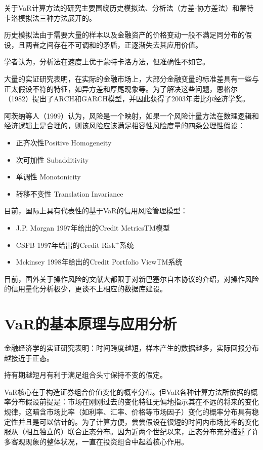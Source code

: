 \documentclass[UTF8]{ctexart}
\begin{document}
关于VaR计算方法的研究主要围绕历史模拟法、分析法（方差-协方差法）和蒙特卡洛模拟法三种方法展开的。

历史模拟法由于需要大量的样本以及金融资产的价格变动一般不满足同分布的假设，且两者之间存在不可调和的矛盾，正逐渐失去其应用价值。

学者认为，分析法在速度上优于蒙特卡洛方法，但准确性不如它。

大量的实证研究表明，在实际的金融市场上，大部分金融变量的标准差具有一些与正太假设不符的特征，如异方差和厚尾现象等。为了解决这些问题，恩格尔（1982）提出了ARCH和GARCH模型，并因此获得了2003年诺比尔经济学奖。

阿茨纳等人（1999）认为，风险是一个映射，如果一个风险计量方法在数理逻辑和经济逻辑上是合理的，则该风险应该满足相容性风险度量的四条公理性假设：
\begin{itemize}
\item 正齐次性Positive Homogeneity
\item 次可加性 Subadditivity
\item 单调性 Monotonicity
\item 转移不变性 Translation Invariance
\end{itemize}

目前，国际上具有代表性的基于VaR的信用风险管理模型：
\begin{itemize}
\item J.P. Morgan 1997年给出的Credit MetricsTM模型
\item CSFB 1997年给出的Credit Risk$^+$系统
\item Mckinsey 1998年给出的Credit Portfolio ViewTM系统
\end{itemize}

目前，国外关于操作风险的文献大都限于对新巴塞尔自本协议的介绍，对操作风险的信用量化分析极少，更谈不上相应的数据库建设。

\section{VaR的基本原理与应用分析}

金融经济学的实证研究表明：时间跨度越短，样本产生的数据越多，实际回报分布越接近于正态。

持有期越短月有利于满足组合头寸保持不变的假定。

VaR核心在于构造证券组合价值变化的概率分布。但VaR各种计算方法所依据的概率分布假设前提是：市场在刚刚过去的变化特征无偏地指示其在不远的将来的变化规律，这暗含市场比率（如利率、汇率、价格等市场因子）变化的概率分布具有稳定性并且是可以估计的。为了计算方便，尝尝假设在很短的时间内市场比率的变化服从（相互独立的）联合正态分布。因为近两个世纪以来，正态分布充分描述了许多客观现象的整体状况，一直在投资组合中起着核心作用。
\end{document}
